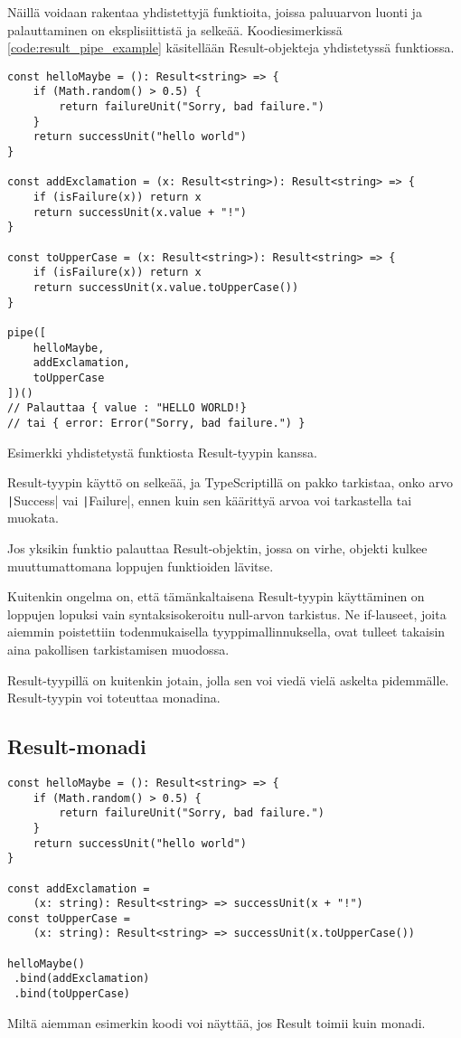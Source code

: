 Näillä voidaan rakentaa yhdistettyjä funktioita, joissa paluuarvon luonti ja palauttaminen on eksplisiittistä ja selkeää. Koodiesimerkissä \ref{code:result_pipe_example} käsitellään Result-objekteja yhdistetyssä funktiossa.

\begin{code}
    \begin{verbatim}
const helloMaybe = (): Result<string> => {
    if (Math.random() > 0.5) {
        return failureUnit("Sorry, bad failure.")
    }
    return successUnit("hello world")
}

const addExclamation = (x: Result<string>): Result<string> => {
    if (isFailure(x)) return x
    return successUnit(x.value + "!")
}

const toUpperCase = (x: Result<string>): Result<string> => {
    if (isFailure(x)) return x
    return successUnit(x.value.toUpperCase())
}

pipe([
    helloMaybe,
    addExclamation,
    toUpperCase
])()
// Palauttaa { value : "HELLO WORLD!}
// tai { error: Error("Sorry, bad failure.") }
    \end{verbatim}
    \caption{Esimerkki yhdistetystä funktiosta Result-tyypin kanssa.}
    \label{code:result_pipe_example}
\end{code}

Result-tyypin käyttö on selkeää, ja TypeScriptillä on pakko tarkistaa, onko arvo \texttt|Success| vai \texttt|Failure|, ennen kuin sen käärittyä arvoa voi tarkastella tai muokata.

Jos yksikin funktio palauttaa Result-objektin, jossa on virhe, objekti kulkee muuttumattomana loppujen funktioiden lävitse.

Kuitenkin ongelma on, että tämänkaltaisena Result-tyypin käyttäminen on loppujen lopuksi vain syntaksisokeroitu null-arvon tarkistus. Ne if-lauseet, joita aiemmin poistettiin todenmukaisella tyyppimallinnuksella, ovat tulleet takaisin aina pakollisen tarkistamisen muodossa.

Result-tyypillä on kuitenkin jotain, jolla sen voi viedä vielä askelta pidemmälle. Result-tyypin voi toteuttaa monadina.


\subsection{Result-monadi}

\begin{code}
    \begin{verbatim}
const helloMaybe = (): Result<string> => {
    if (Math.random() > 0.5) {
        return failureUnit("Sorry, bad failure.")
    }
    return successUnit("hello world")
}

const addExclamation = 
    (x: string): Result<string> => successUnit(x + "!")
const toUpperCase = 
    (x: string): Result<string> => successUnit(x.toUpperCase())

helloMaybe()
 .bind(addExclamation)
 .bind(toUpperCase)
\end{verbatim}
    \caption{Miltä aiemman esimerkin koodi voi näyttää, jos Result toimii kuin monadi.}
    \label{code:result_monad_example}
\end{code}
